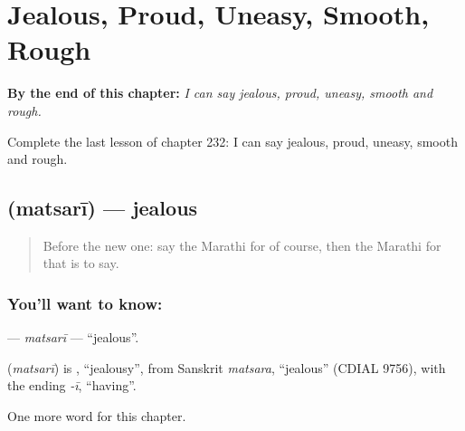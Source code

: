
\chapter{Jealous, Proud, Uneasy, Smooth, Rough}
\label{ch:mr-jealous-proud-uneasy-smooth-rough}

\begin{chapteropening}
\textbf{By the end of this chapter:} \emph{I can say jealous, proud, uneasy, smooth and rough.}

Complete the last lesson of chapter 232: I can say jealous, proud, uneasy, smooth and rough.
\end{chapteropening}

\section[\texorpdfstring{\mr{मत्सरी} (matsarī)}{मत्सरी (matsarī)}]{ (matsarī) — jealous}

\label{lesson:MR-C232-matsari}



\begin{quote}
Before the new one: say the Marathi for of course, then the Marathi for that is to say.
\end{quote}

\subsection*{You'll want to know: }
\textbf{} — \emph{matsarī} — \textquotedblleft{}jealous\textquotedblright{}.

\begin{cousinweb}
\textbf{} (\emph{matsarī}) is \textbf{}, \textquotedblleft{}jealousy\textquotedblright{}, from Sanskrit \emph{matsara}, \textquotedblleft{}jealous\textquotedblright{} (CDIAL 9756), with the ending \emph{-ī}, \textquotedblleft{}having\textquotedblright{}.
\end{cousinweb}

\begin{grammarlens}[title={What you've built}]
One more word for this chapter.
\end{grammarlens}

